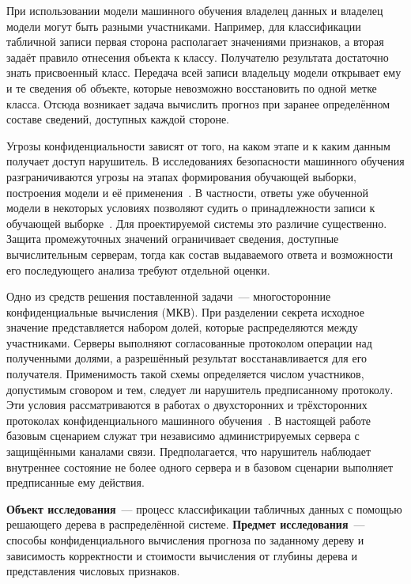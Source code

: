\introduction

При использовании модели машинного обучения владелец данных и владелец
модели могут быть разными участниками. Например, для классификации
табличной записи первая сторона располагает значениями признаков, а вторая
задаёт правило отнесения объекта к классу. Получателю результата достаточно
знать присвоенный класс. Передача всей записи владельцу модели открывает
ему и те сведения об объекте, которые невозможно восстановить по одной
метке класса. Отсюда возникает задача вычислить прогноз при заранее
определённом составе сведений, доступных каждой стороне.

Угрозы конфиденциальности зависят от того, на каком этапе и к каким данным
получает доступ нарушитель. В исследованиях безопасности машинного обучения
разграничиваются угрозы на этапах формирования обучающей выборки, построения
модели и её применения~\cite{ilyushin2022attacks,papernot2018sok}.
В частности, ответы уже обученной модели в некоторых условиях позволяют
судить о принадлежности записи к обучающей выборке~\cite{shokri2017mia}.
Для проектируемой системы это различие существенно. Защита промежуточных
значений ограничивает сведения, доступные вычислительным серверам, тогда
как состав выдаваемого ответа и возможности его последующего анализа
требуют отдельной оценки.

Одно из средств решения поставленной задачи~--- многосторонние
конфиденциальные вычисления (МКВ). При разделении секрета исходное значение
представляется набором долей, которые распределяются между участниками.
Серверы выполняют согласованные протоколом операции над полученными долями,
а разрешённый результат восстанавливается для его получателя. Применимость
такой схемы определяется числом участников, допустимым сговором и тем,
следует ли нарушитель предписанному протоколу. Эти условия рассматриваются
в работах о двухсторонних и трёхсторонних протоколах конфиденциального
машинного обучения~\cite{zapechnikov2021two,zapechnikov2022three}.
В настоящей работе базовым сценарием служат три независимо администрируемых
сервера с защищёнными каналами связи. Предполагается, что нарушитель
наблюдает внутреннее состояние не более одного сервера и в базовом
сценарии выполняет предписанные ему действия.

\textbf{Объект исследования}~--- процесс классификации табличных данных
с помощью решающего дерева в распределённой системе.
\textbf{Предмет исследования}~--- способы конфиденциального вычисления
прогноза по заданному дереву и зависимость корректности и стоимости
вычисления от глубины дерева и представления числовых признаков.

